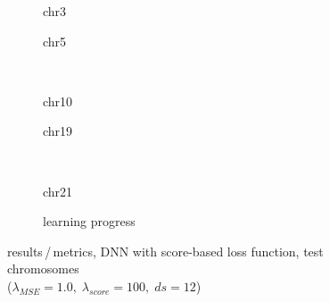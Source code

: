 \begin{figure}[p]
    \begin{subfigure}{0.45\textwidth}
        \scriptsize
        \caption{chr3}
    \end{subfigure} \hfill
    \begin{subfigure}{0.45\textwidth}
        \scriptsize
        \caption{chr5}
    \end{subfigure}\\[5mm]
    \begin{subfigure}{0.45\textwidth}
        \scriptsize
        \caption{chr10}
    \end{subfigure}\hfill
    \begin{subfigure}{0.45\textwidth}
        \scriptsize
        \caption{chr19}
    \end{subfigure}\\[3mm]
    \begin{subfigure}{0.45\textwidth}
        \scriptsize
        \caption{chr21}
    \end{subfigure}\hfill
    \begin{subfigure}{0.45\textwidth}
        \caption{learning progress} \label{fig:results:scoreLossDNN_lossEpochs}
    \end{subfigure}
    \caption{results\,/\,metrics, DNN with score-based loss function, test chromosomes\\ ($\lambda_\mathit{MSE}=1.0,\; \lambda_\mathit{score}=100,\; ds=12$)} \label{fig:results:scoreLossDNN_pearson}
\end{figure}


